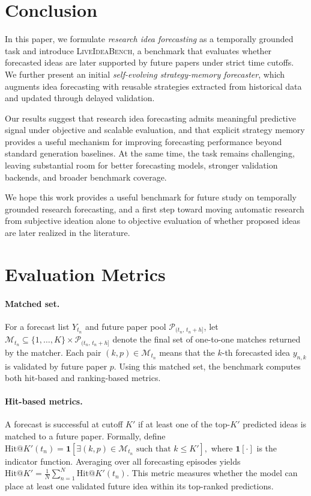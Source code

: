 \documentclass{article} %
\begin{document}
\section{Conclusion}

In this paper, we formulate \emph{research idea forecasting} as a temporally grounded task and introduce \textsc{LiveIdeaBench}, a benchmark that evaluates whether forecasted ideas are later supported by future papers under strict time cutoffs. We further present an initial \emph{self-evolving strategy-memory forecaster}, which augments idea forecasting with reusable strategies extracted from historical data and updated through delayed validation.

Our results suggest that research idea forecasting admits meaningful predictive signal under objective and scalable evaluation, and that explicit strategy memory provides a useful mechanism for improving forecasting performance beyond standard generation baselines. At the same time, the task remains challenging, leaving substantial room for better forecasting models, stronger validation backends, and broader benchmark coverage.

We hope this work provides a useful benchmark for future study on temporally grounded research forecasting, and a first step toward moving automatic research from subjective ideation alone to objective evaluation of whether proposed ideas are later realized in the literature.





\appendix 

\section{Evaluation Metrics}

\paragraph{Matched set.}
For a forecast list $Y_{t_n}$ and future paper pool $\mathcal{P}_{(t_n,\,t_n+h]}$, let
$
\mathcal{M}_{t_n} \subseteq \{1,\dots,K\} \times \mathcal{P}_{(t_n,\,t_n+h]}
$
denote the final set of one-to-one matches returned by the matcher. Each pair
$
(k, p) \in \mathcal{M}_{t_n}
$
means that the $k$-th forecasted idea $y_{n,k}$ is validated by future paper $p$. Using this matched set, the benchmark computes both hit-based and ranking-based metrics.

\paragraph{Hit-based metrics.}
A forecast is successful at cutoff $K'$ if at least one of the top-$K'$ predicted ideas is matched to a future paper. Formally, define
$
\mathrm{Hit@}K'(t_n) =
\mathbf{1}\!\left[
\exists (k,p) \in \mathcal{M}_{t_n}
\text{ such that } k \le K'
\right],
$
where $\mathbf{1}[\cdot]$ is the indicator function. Averaging over all forecasting episodes yields
$
\mathrm{Hit@}K' =
\frac{1}{N}\sum_{n=1}^{N} \mathrm{Hit@}K'(t_n).
$
This metric measures whether the model can place at least one validated future idea within its top-ranked predictions.
\end{document}
